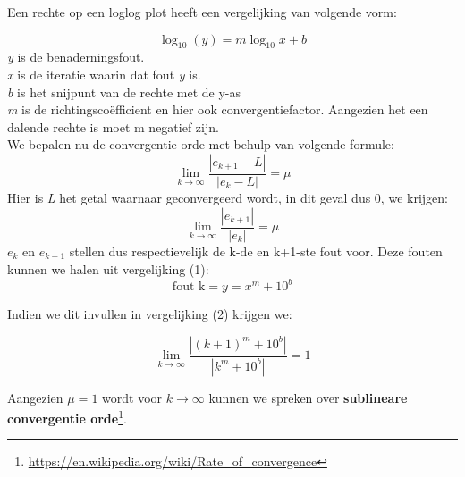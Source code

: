 \documentclass[11pt,a4paper]{article}
\begin{document}
Een rechte op een loglog plot heeft een vergelijking van volgende vorm:

\begin{equation}
\log_{10}(y) = m\log_{10}x + b 
\end{equation}
\textit{y} is de benaderningsfout.\\
\textit{x} is de iteratie waarin dat fout \textit{y} is.\\
\textit{b} is het snijpunt van de rechte met de y-as \\
\textit{m} is de richtingscoëfficient en hier ook convergentiefactor. Aangezien het een dalende rechte is moet m negatief zijn.\\
We bepalen nu de convergentie-orde met behulp van volgende formule:
$$\lim_{k\rightarrow\infty} \frac{|e_{k+1} - L|}{|e_k - L|} = \mu$$
Hier is \textit{L} het getal waarnaar geconvergeerd wordt, in dit geval dus 0, we krijgen:
\begin{equation}
\lim_{k\rightarrow\infty} \frac{|e_{k+1}|}{|e_k|} = \mu
\end{equation}
$e_k$ en $e_{k+1}$ stellen dus respectievelijk de k-de en k+1-ste fout voor. Deze fouten kunnen we halen uit vergelijking (1):
$$\text{fout k} = y = x^m + 10^b$$

Indien we dit invullen in vergelijking (2) krijgen we:

$$\lim_{k\rightarrow\infty} \frac{|(k+1)^m + 10^b|}{|k^m + 10^b|} = 1$$


Aangezien $\mu=1$ wordt voor $k\rightarrow \infty$ kunnen we spreken over \textbf{sublineare convergentie orde}\footnote{\url{https://en.wikipedia.org/wiki/Rate_of_convergence}}. 


\end{document}
